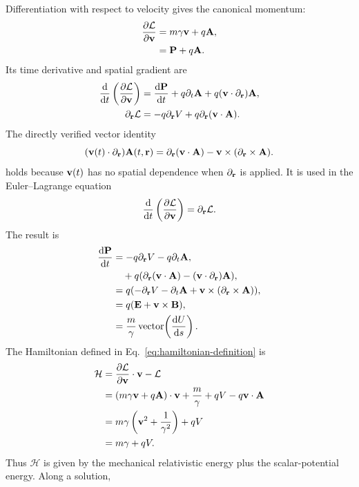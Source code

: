 Differentiation with respect to velocity gives the canonical momentum:
\begin{align*}
\frac{\partial\mathcal L}{\partial\mathbf{v}}
&= m \gamma \mathbf{v} + q \mathbf{A},\notag \\
&= \mathbf{P} + q \mathbf{A}.
\end{align*}
Its time derivative and spatial gradient are
\begin{align*}
\frac{\mathrm d}{\mathrm d t}
\left(\frac{\partial\mathcal L}{\partial\mathbf{v}}\right)
&= \frac{\mathrm d\mathbf{P}}{\mathrm d t} + q \partial _{t} \mathbf{A}
+ q (\mathbf{v} \cdot \partial_{\mathbf{r}}) \mathbf{A}, \\
\partial_{\mathbf{r}} \mathcal{L} &= - q \partial_{\mathbf{r}} V + q \partial_{\mathbf{r}} (\mathbf{v} \cdot \mathbf{A}).
\end{align*}
The directly verified vector identity
\begin{equation*}
(\mathbf{v}(t) \cdot \partial_{\mathbf{r}}) \mathbf{A}(t, \mathbf{r}) = \partial_{\mathbf{r}} ( \mathbf{v} \cdot \mathbf{A} ) - \mathbf{v} \times ( \partial_{\mathbf{r}} \times \mathbf{A} ).
\end{equation*}
holds because \(\mathbf{v}(t)\) has no spatial dependence when
\(\partial_{\mathbf{r}}\) is applied. It is used in the Euler--Lagrange equation
\begin{equation*}
\frac{\mathrm d}{\mathrm d t}
\left(\frac{\partial\mathcal L}{\partial\mathbf{v}}\right)
=\partial_{\mathbf{r}}\mathcal L.
\end{equation*}
The result is
\begin{align*}
\frac{\mathrm d\mathbf{P}}{\mathrm d t} &= - q \partial_{\mathbf{r}} V - q \partial _{t} \mathbf{A},\notag \\
&\quad + q ( \partial_{\mathbf{r}} (\mathbf{v} \cdot \mathbf{A}) - (\mathbf{v} \cdot \partial_{\mathbf{r}}) \mathbf{A} ),\notag \\
&= q ( -\partial_{\mathbf{r}} V - \partial _{t}\mathbf{A} + \mathbf{v} \times ( \partial_{\mathbf{r}} \times \mathbf{A} ) ),\notag \\
&= q ( \mathbf{E} + \mathbf{v} \times \mathbf{B} ),\notag \\
&= \frac{m}{\gamma}\operatorname{vector}\!\left(\frac{\mathrm d U}{\mathrm d s}\right).
\end{align*}
The Hamiltonian defined in Eq.\ \eqref{eq:hamiltonian-definition} is
\begin{align*}
\mathcal H
&=\frac{\partial\mathcal L}{\partial\mathbf{v}}\cdot\mathbf{v}
-\mathcal L\notag\\
&=(m\gamma\mathbf{v}+q\mathbf{A})\cdot\mathbf{v}
+\frac{m}{\gamma}+qV-q\mathbf{v}\cdot\mathbf{A}\notag\\
&=m\gamma\left(\mathbf{v}^2+\frac{1}{\gamma^2}\right)+qV\notag\\
&=m\gamma+qV.
\end{align*}
Thus \(\mathcal H\) is given by the mechanical relativistic energy plus the scalar-potential energy. Along a solution,
